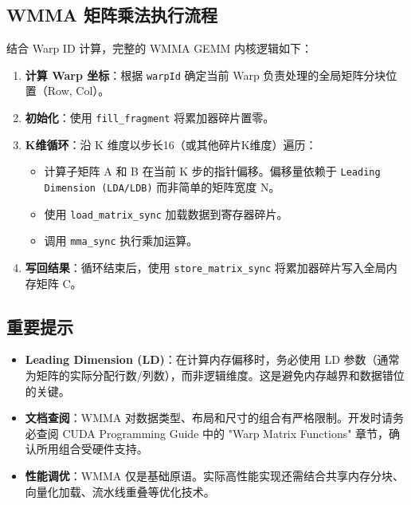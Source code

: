 \subsection{WMMA 矩阵乘法执行流程}
结合 Warp ID 计算，完整的 WMMA GEMM 内核逻辑如下：

\begin{enumerate}
    \item \textbf{计算 Warp 坐标}：根据 \texttt{warpId} 确定当前 Warp 负责处理的全局矩阵分块位置（Row, Col）。
    \item \textbf{初始化}：使用 \texttt{fill\_fragment} 将累加器碎片置零。
    \item \textbf{K维循环}：沿 K 维度以步长16（或其他碎片K维度）遍历：
    \begin{itemize}
        \item 计算子矩阵 A 和 B 在当前 K 步的指针偏移。偏移量依赖于 \texttt{Leading Dimension (LDA/LDB)} 而非简单的矩阵宽度 N。
        \item 使用 \texttt{load\_matrix\_sync} 加载数据到寄存器碎片。
        \item 调用 \texttt{mma\_sync} 执行乘加运算。
    \end{itemize}
    \item \textbf{写回结果}：循环结束后，使用 \texttt{store\_matrix\_sync} 将累加器碎片写入全局内存矩阵 C。
\end{enumerate}

\subsection{重要提示}
\begin{itemize}
    \item \textbf{Leading Dimension (LD)}：在计算内存偏移时，务必使用 LD 参数（通常为矩阵的实际分配行数/列数），而非逻辑维度。这是避免内存越界和数据错位的关键。
    \item \textbf{文档查阅}：WMMA 对数据类型、布局和尺寸的组合有严格限制。开发时请务必查阅 CUDA Programming Guide 中的 "Warp Matrix Functions" 章节，确认所用组合受硬件支持。
    \item \textbf{性能调优}：WMMA 仅是基础原语。实际高性能实现还需结合共享内存分块、向量化加载、流水线重叠等优化技术。
\end{itemize}

